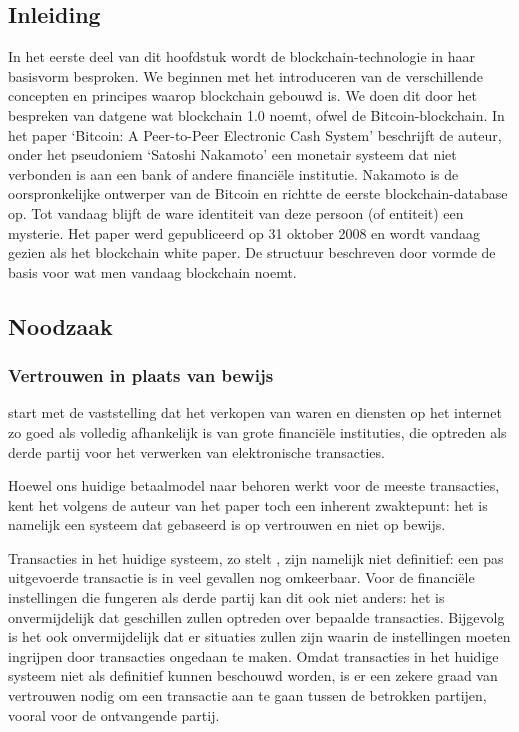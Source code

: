 	\subsection*{Inleiding}
	In het eerste deel van dit hoofdstuk wordt de blockchain-technologie in haar basisvorm besproken. We beginnen met het introduceren van de verschillende concepten en principes waarop blockchain gebouwd is.  We doen dit door het bespreken van datgene wat \textcite{Swan2015} blockchain 1.0 noemt, ofwel de Bitcoin-blockchain. In het paper `Bitcoin: A Peer-to-Peer Electronic Cash System' beschrijft de auteur, onder het pseudoniem `Satoshi Nakamoto' een monetair systeem dat niet verbonden is aan een bank of  andere financiële institutie. Nakamoto is de oorspronkelijke ontwerper van de Bitcoin en richtte de eerste blockchain-database op. Tot vandaag blijft de ware identiteit van deze persoon (of entiteit) een mysterie. Het paper werd gepubliceerd op 31 oktober 2008 en wordt vandaag gezien als het blockchain white paper. De structuur beschreven door \textcite{Nakamoto2008} vormde de basis voor wat men vandaag blockchain noemt.
	\subsection{Noodzaak}
			\subsubsection{Vertrouwen in plaats van bewijs}
			\textcite{Nakamoto2008} start met de vaststelling dat het verkopen van waren en diensten op het internet zo goed als volledig afhankelijk is van grote financiële instituties, die optreden als derde partij voor het verwerken van elektronische transacties. 
		
			Hoewel ons huidige betaalmodel naar behoren werkt voor de meeste transacties, kent het volgens de auteur van het paper toch een inherent zwaktepunt: het is namelijk een systeem dat gebaseerd is op vertrouwen en niet op bewijs.
			
			Transacties in het huidige systeem, zo stelt \textcite{Nakamoto2008}, zijn namelijk niet definitief: een pas uitgevoerde transactie is in veel gevallen nog omkeerbaar. Voor de financiële instellingen die fungeren als derde partij kan dit ook niet anders: het is onvermijdelijk dat geschillen zullen optreden over bepaalde transacties. Bijgevolg is het ook onvermijdelijk dat er situaties zullen zijn waarin de instellingen moeten ingrijpen door transacties ongedaan te maken. Omdat transacties in het huidige systeem niet als definitief kunnen beschouwd worden, is er een zekere graad van vertrouwen nodig om een transactie aan te gaan tussen de betrokken partijen, vooral voor de ontvangende partij. 
			

